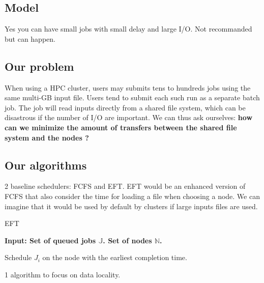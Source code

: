 \documentclass[a4paper]{article}
\newcommand{\jobset}{\ensuremath{\mathbb{J}}\xspace}
\newcommand{\nodeset}{\ensuremath{\mathbb{N}}\xspace}
\begin{document}
\subsection{Model}

Yes you can have small jobs with small delay and large I/O. Not recommanded but can happen.

\subsection{Our problem}

When using a HPC cluster, users may submits tens to hundreds jobs using the same multi-GB input file.
Users tend to submit each such run as a separate batch job.
The job will read inputs directly from a shared file system, which can be disastrous if the number of I/O are important.
We can thus ask ourselves: \textbf{how can we minimize the amount of transfers between the shared file system and the nodes ?}

\subsection{Our algorithms}

2 baseline schedulers: FCFS and EFT. EFT would be an enhanced version of FCFS that also consider the time for loading a file when choosing a node.
We can imagine that it would be used by default by clusters if large inputs files are used.

\begin{algorithm}[htbp]
\caption{EFT}
\hspace*{\algorithmicindent} \textbf{Input: Set of queued jobs $\jobset$. Set of nodes $\nodeset$.}
\begin{algorithmic}[1]
\ForEach {$J_i \in \jobset$}
	\State Schedule $J_i$ on the node with the earliest completion time. 
\EndFor
\end{algorithmic}
\end{algorithm}

1 algorithm to focus on data locality.
\end{document}
